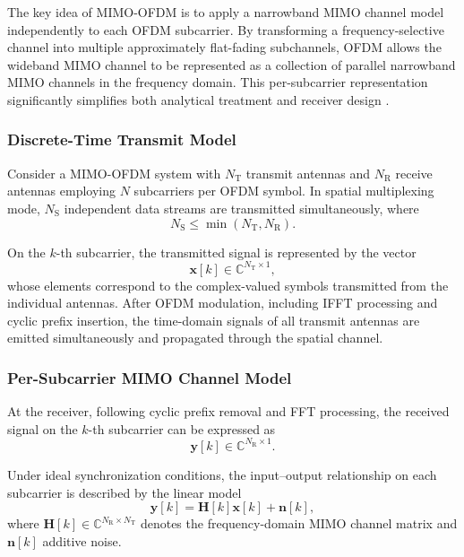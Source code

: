 The key idea of MIMO-OFDM is to apply a narrowband MIMO channel model independently to each OFDM subcarrier. By transforming a frequency-selective channel into multiple approximately flat-fading subchannels, OFDM allows the wideband MIMO channel to be represented as a collection of parallel narrowband MIMO channels in the frequency domain. This per-subcarrier representation significantly simplifies both analytical treatment and receiver design \cite{proakis2008digital,haring_ofdm_lecture}.

\subsubsection{Discrete-Time Transmit Model}

Consider a MIMO-OFDM system with $N_\mathrm{T}$ transmit antennas and $N_\mathrm{R}$ receive antennas employing $N$ subcarriers per OFDM symbol. In spatial multiplexing mode, $N_\mathrm{S}$ independent data streams are transmitted simultaneously, where
\[
N_\mathrm{S} \leq \min(N_\mathrm{T}, N_\mathrm{R}).
\]

On the $k$-th subcarrier, the transmitted signal is represented by the vector
\[
\mathbf{x}[k] \in \mathbb{C}^{N_\mathrm{T} \times 1},
\]
whose elements correspond to the complex-valued symbols transmitted from the individual antennas. After OFDM modulation, including IFFT processing and cyclic prefix insertion, the time-domain signals of all transmit antennas are emitted simultaneously and propagated through the spatial channel.

\subsubsection{Per-Subcarrier MIMO Channel Model}

At the receiver, following cyclic prefix removal and FFT processing, the received signal on the $k$-th subcarrier can be expressed as
\[
\mathbf{y}[k] \in \mathbb{C}^{N_\mathrm{R} \times 1}.
\]

Under ideal synchronization conditions, the input--output relationship on each subcarrier is described by the linear model
\begin{equation}
\mathbf{y}[k] = \mathbf{H}[k]\mathbf{x}[k] + \mathbf{n}[k],
\label{eq:mimo_ofdm_model}
\end{equation}
where $\mathbf{H}[k] \in \mathbb{C}^{N_\mathrm{R} \times N_\mathrm{T}}$ denotes the frequency-domain MIMO channel matrix and $\mathbf{n}[k]$ additive noise.

